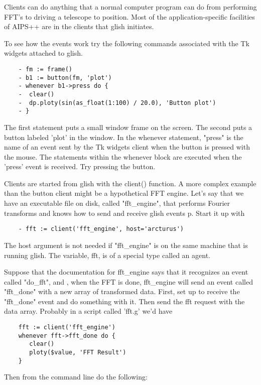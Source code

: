     Clients can do anything that a normal computer program can do from
performing FFT's to driving a telescope to position.  Most of the
application-specific facilities of AIPS++ are in the clients that glish
initiates.

    To see how the events work try the following commands associated with
the Tk widgets attached to glish.

\begin{verbatim}
	- fm := frame()
	- b1 := button(fm, 'plot')
	- whenever b1->press do {
	-  clear()
	-  dp.ploty(sin(as_float(1:100) / 20.0), 'Button plot')
	- }
\end{verbatim}

The first statement puts a small window frame on the screen.  The second
puts a button labeled 'plot' in the window.  In the whenever statement,
"press" is the name of an event sent by the Tk widgets client when the
button is pressed with the mouse.  The statements within the whenever block
are executed when the 'press' event is received.  Try pressing the button.

    Clients are started from glish with the client() function.  A more
complex example than the button client might be a hypothetical FFT engine.
Let's say that we have an executable file on disk, called "fft\_engine",
that performs Fourier transforms and knows how to send and receive glish
events p.  Start it up with

\begin{verbatim}
	- fft := client('fft_engine', host='arcturus')
\end{verbatim}

The host argument is not needed if "fft\_engine" is on the same machine that
is running glish.  The variable, fft, is of a special type called an agent.

    Suppose that the documentation for fft\_engine says that it recognizes
an event called "do\_fft", and , when the FFT is done, fft\_engine will send
an event called "fft\_done" with a new array of transformed data.  First,
set up to receive the "fft\_done" event and do something with it.  Then send
the fft request with the data array.  Probably in a script called 'fft.g'
we'd have

\begin{verbatim}
	fft := client('fft_engine')
	whenever fft->fft_done do {
	   clear()
	   ploty($value, 'FFT Result')
	}
\end{verbatim}

Then from the command line do the following:

